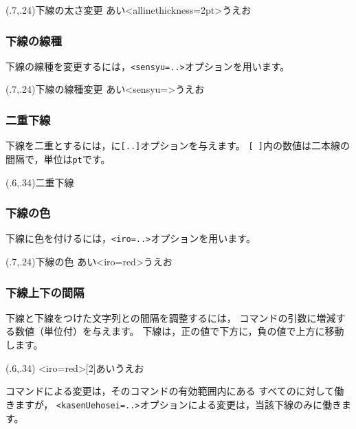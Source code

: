 \begin{showEx}(.7,.24){下線の太さ変更}
あい\phkasen<allinethickness=2pt>{うえ}お
\end{showEx}

\subsubsection{下線の線種}
下線の線種を変更するには，\verb+<sensyu=..>+オプションを用います。

\begin{showEx}(.7,.24){下線の線種変更}
あい\phkasen<sensyu=\hasen>{うえ}お
\end{showEx}


\subsubsection{二重下線}
下線を二重とするには，に\verb+[..]+オプションを与えます。
\verb+[ ]+内の数値は二本線の間隔で，単位は\verb+pt+です。

\begin{showEx}(.6,.34){二重下線}
\end{showEx}


\subsubsection{下線の色}
下線に色を付けるには，\verb+<iro=..>+オプションを用います。

\begin{showEx}(.7,.24){下線の色}
あい\phkasen<iro=red>{うえ}お
\end{showEx}

\subsubsection{下線上下の間隔}
下線と下線をつけた文字列との間隔を調整するには，
コマンドの引数に増減する数値（単位付）を与えます。
下線は，正の値で下方に，負の値で上方に移動します。

\begin{showEx}(.6,.34){}
\kasenUehosei{-6pt}%
\phkasen<iro=red>[2]{あいうえお}
\end{showEx}

コマンドによる変更は，そのコマンドの有効範囲内にある
すべてのに対して働きますが，
\verb+<kasenUehosei=..>+オプションによる変更は，当該下線のみに働きます。

